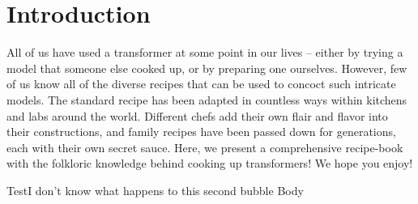 %
\chapter{Introduction}
%

All of us have used a transformer at some point in our lives -- either by trying a model that someone else cooked up, or by preparing one ourselves. 
However, few of us know all of the diverse recipes that can be used to concoct such intricate models. 
The standard recipe \citep{vaswani-etal-2017-attention} has been adapted in countless ways within kitchens and labs around the world. 
Different chefs add their own flair and flavor into their constructions, and family recipes have been passed down for generations, each with their own secret sauce. 
Here, we present a comprehensive recipe-book with the folkloric knowledge behind cooking up transformers! 
We hope you enjoy!

\begin{theorem}{Test}{I don't know what happens to this second bubble}
    Body 
\end{theorem}
